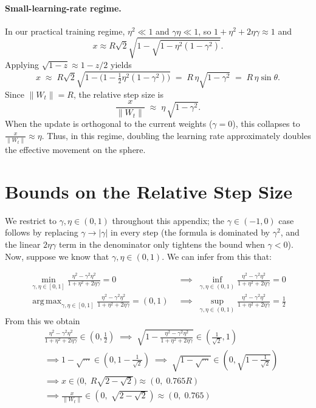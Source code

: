 \documentclass{article}
\DeclareMathOperator*{\argmax}{arg\,max}
\begin{document}
\paragraph{Small-learning-rate regime.} In our practical training regime, $\eta^2\ll 1$ and $\gamma\eta\ll 1$, so $1+\eta^2+2\eta\gamma\approx 1$ and
\[
x\approx R\sqrt{2}\sqrt{1-\sqrt{1-\eta^2(1-\gamma^2)}}.
\]
Applying $\sqrt{1-z}\approx 1-z/2$ yields
\[
x \;\approx\; R\sqrt{2}\sqrt{1-\bigl(1-\tfrac{1}{2}\eta^2(1-\gamma^2)\bigr)}
\;=\; R\,\eta\sqrt{1-\gamma^2}
\;=\; R\,\eta\sin\theta.
\]
Since $\|W_t\|=R$, the relative step size is
\[
\frac{x}{\|W_t\|} \;\approx\; \eta\,\sqrt{1-\gamma^2}.
\]
When the update is orthogonal to the current weights ($\gamma=0$), this collapses to $\frac{x}{\|W_t\|}\approx \eta$. Thus, in this regime, doubling the learning rate approximately doubles the effective movement on the sphere.


\section{Bounds on the Relative Step Size}
\label{app:bounds}

We restrict to $\gamma,\eta\in(0,1)$ throughout this appendix; the $\gamma\in(-1,0)$ case follows by replacing $\gamma\to|\gamma|$ in every step (the formula is dominated by $\gamma^2$, and the linear $2\eta\gamma$ term in the denominator only tightens the bound when $\gamma<0$). Now, suppose we know that $\gamma,\eta\in(0,1)$. We can infer from this that:

\[
\begin{aligned}
\min_{\gamma,\eta\in[0,1]} \frac{\eta^2-\gamma^2\eta^2}{1+\eta^2+2\eta\gamma} = 0
\;&\implies\;
\inf_{\gamma,\eta\in(0,1)} \frac{\eta^2-\gamma^2\eta^2}{1+\eta^2+2\eta\gamma} = 0 \\
\argmax_{\gamma,\eta\in[0,1]} \frac{\eta^2-\gamma^2\eta^2}{1+\eta^2+2\eta\gamma} =
(0,1)\;&\implies\;
\sup_{\gamma,\eta\in(0,1)}\frac{\eta^2-\gamma^2\eta^2}{1+\eta^2+2\eta\gamma}=\tfrac{1}{2}
\end{aligned}
\]
From this we obtain
\[
\begin{aligned}
&\frac{\eta^2-\gamma^2\eta^2}{1+\eta^2+2\eta\gamma}\in (0,\tfrac{1}{2})
\;\implies\;
\sqrt{1-\frac{\eta^2-\gamma^2\eta^2}{1+\eta^2+2\eta\gamma}}\in
(\tfrac{1}{\sqrt2},1)\\
&\implies
1-\sqrt{\cdots}\in
(0,1-\tfrac{1}{\sqrt2})
\;\implies\;
\sqrt{1-\sqrt{\cdots}}\in
(0,\sqrt{1-\tfrac{1}{\sqrt2}})\\
&\implies x\in \bigl(0,\; R\sqrt{2-\sqrt{2}}\bigr)
\approx (0,\; 0.765R)\\
&\implies \frac{x}{\|W_t\|}\in (0,\;\sqrt{2-\sqrt{2}})\approx (0,\; 0.765)
\end{aligned}
\]
\end{document}
